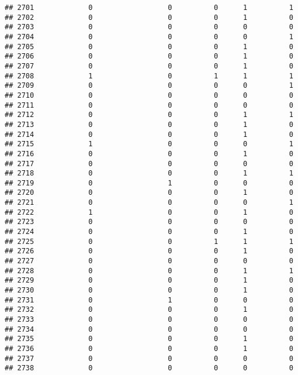 \documentclass[
]{article}
\begin{document}
\begin{verbatim}
## 2701             0                  0          0      1          1
## 2702             0                  0          0      1          0
## 2703             0                  0          0      0          0
## 2704             0                  0          0      0          1
## 2705             0                  0          0      1          0
## 2706             0                  0          0      1          0
## 2707             0                  0          0      1          0
## 2708             1                  0          1      1          1
## 2709             0                  0          0      0          1
## 2710             0                  0          0      0          0
## 2711             0                  0          0      0          0
## 2712             0                  0          0      1          1
## 2713             0                  0          0      1          0
## 2714             0                  0          0      1          0
## 2715             1                  0          0      0          1
## 2716             0                  0          0      1          0
## 2717             0                  0          0      0          0
## 2718             0                  0          0      1          1
## 2719             0                  1          0      0          0
## 2720             0                  0          0      1          0
## 2721             0                  0          0      0          1
## 2722             1                  0          0      1          0
## 2723             0                  0          0      0          0
## 2724             0                  0          0      1          0
## 2725             0                  0          1      1          1
## 2726             0                  0          0      1          0
## 2727             0                  0          0      0          0
## 2728             0                  0          0      1          1
## 2729             0                  0          0      1          0
## 2730             0                  0          0      1          0
## 2731             0                  1          0      0          0
## 2732             0                  0          0      1          0
## 2733             0                  0          0      0          0
## 2734             0                  0          0      0          0
## 2735             0                  0          0      1          0
## 2736             0                  0          0      1          0
## 2737             0                  0          0      0          0
## 2738             0                  0          0      0          0

\end{verbatim}
\end{document}
